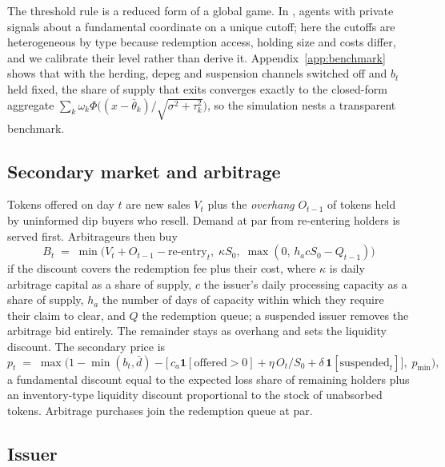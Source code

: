 The threshold rule is a reduced form of a global game. In \citet{goldstein2005}, agents with private signals about a
fundamental coordinate on a unique cutoff; here the cutoffs are heterogeneous by type because redemption access,
holding size and costs differ, and we calibrate their level rather than derive it. Appendix~\ref{app:benchmark}
shows that with the herding, depeg and suspension channels switched off and $b_t$ held fixed, the share of supply that
exits converges exactly to the closed-form aggregate $\sum_k \omega_k \Phi\!\big((x-\bar\theta_k)/\sqrt{\sigma^2+\tau_k^2}\big)$,
so the simulation nests a transparent benchmark.

\subsection{Secondary market and arbitrage}

Tokens offered on day $t$ are new sales $V_t$ plus the \emph{overhang} $O_{t-1}$ of tokens held by uninformed dip
buyers who resell. Demand at par from re-entering holders is served first. Arbitrageurs then buy
\begin{equation}
B_t \;=\; \min\!\big(V_t + O_{t-1} - \text{re-entry}_t,\; \kappa S_0,\; \max(0,\, h_a c S_0 - Q_{t-1})\big)
\end{equation}
if the discount covers the redemption fee plus their cost, where $\kappa$ is daily arbitrage capital as a share of
supply, $c$ the issuer's daily processing capacity as a share of supply, $h_a$ the number of days of capacity within
which they require their claim to clear, and $Q$ the redemption queue; a suspended issuer removes the arbitrage bid
entirely. The remainder stays as overhang and sets the liquidity discount. The secondary price is
\begin{equation}
p_t \;=\; \max\Big(1 - \min(b_t, \bar d) - \big[\,c_a \mathbf{1}[\text{offered}>0] + \eta\, O_t/S_0 + \delta\,
\mathbf{1}[\text{suspended}_t]\big],\; p_{\min}\Big),
\end{equation}
a fundamental discount equal to the expected loss share of remaining holders plus an inventory-type liquidity
discount proportional to the stock of unabsorbed tokens. Arbitrage purchases join the redemption queue at par.

\subsection{Issuer}

